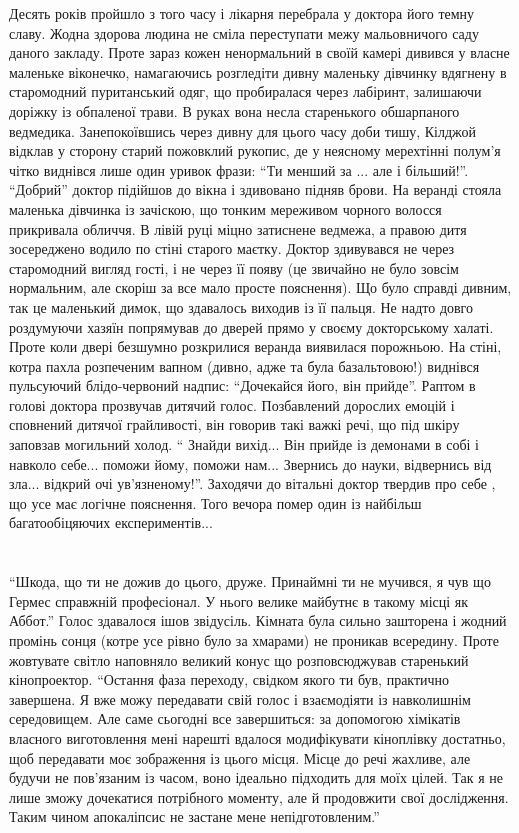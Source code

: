 \documentclass[a4paper,oneside]{book}
\begin{document}
Десять років пройшло з того часу і лікарня перебрала у доктора його темну
славу. Жодна здорова людина не сміла переступати межу мальовничого саду даного
закладу. Проте зараз кожен ненормальний в своїй камері дивився у власне
маленьке віконечко, намагаючись розгледіти дивну маленьку дівчинку вдягнену в
старомодний пуританський одяг, що пробиралася через лабіринт, залишаючи
доріжку із обпаленої трави. В руках вона несла старенького обшарпаного
ведмедика. Занепокоївшись через дивну для цього часу доби тишу, Кілджой
відклав у сторону старий пожовклий рукопис, де у неясному мерехтінні полум’я
чітко виднівся лише один уривок фрази: “Ти менший за ... але і
більший!”. “Добрий” доктор підійшов до вікна і здивовано підняв брови. На
веранді стояла маленька дівчинка із зачіскою, що тонким мереживом чорного
волосся прикривала обличчя. В лівій руці міцно затиснене ведмежа, а правою
дитя зосереджено водило по стіні старого маєтку. Доктор здивувався не через
старомодний вигляд гості, і не через її появу (це звичайно не було зовсім
нормальним, але скоріш за все мало просте пояснення). Що було справді дивним,
так це маленький димок, що здавалось виходив із її пальця. Не надто довго
роздумуючи хазяїн попрямував до дверей прямо у своєму докторському
халаті. Проте коли двері безшумно розкрилися веранда виявилася порожньою. На
стіні, котра пахла розпеченим вапном (дивно, адже та була базальтовою!)
виднівся пульсуючий блідо-червоний надпис: “Дочекайся його, він
прийде”. Раптом в голові доктора прозвучав дитячий голос. Позбавлений дорослих
емоцій і сповнений дитячої грайливості, він говорив такі важкі речі, що під
шкіру заповзав могильний холод. “ Знайди вихід... Він прийде із демонами в
собі і навколо себе... поможи йому, поможи нам... Звернись до науки,
відвернись від зла... відкрий очі ув’язненому!”. Заходячи до вітальні доктор
твердив про себе , що усе має логічне пояснення. Того вечора помер один із
найбільш багатообіцяючих експериментів...

\section*{}
 
“Шкода, що ти не дожив до цього, друже. Принаймні ти не мучився, я чув що
Гермес справжній професіонал. У нього велике майбутнє в такому місці як
Аббот.” Голос здавалося ішов звідусіль. Кімната була сильно зашторена і жодний
промінь сонця (котре усе рівно було за хмарами) не проникав всередину. Проте
жовтувате світло наповняло великий конус що розповсюджував старенький
кінопроектор. “Остання фаза переходу, свідком якого ти був, практично
завершена. Я вже можу передавати свій голос і взаємодіяти із навколишнім
середовищем. Але саме сьогодні все завершиться: за допомогою хімікатів
власного виготовлення мені нарешті вдалося модифікувати кіноплівку достатньо,
щоб передавати моє зображення із цього місця. Місце до речі жахливе, але
будучи не пов’язаним  із часом, воно ідеально підходить для моїх цілей. Так я
не лише зможу дочекатися потрібного моменту, але й продовжити свої
дослідження. Таким чином апокаліпсис не застане мене непідготовленим.”
\end{document}
